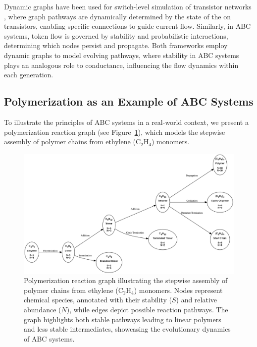 \documentclass[entropy,article,submit,pdftex,oneauthor]{Definitions/mdpi}
\begin{document}
Dynamic graphs have been used for switch-level simulation of transistor networks \cite{AdlerCAD}, where graph pathways are dynamically determined by the state of the on transistors, enabling specific connections to guide current flow. Similarly, in ABC systems, token flow is governed by stability and probabilistic interactions, determining which nodes persist and propagate. Both frameworks employ dynamic graphs to model evolving pathways, where stability in ABC systems plays an analogous role to conductance, influencing the flow dynamics within each generation.

\subsection{Polymerization as an Example of ABC Systems}

To illustrate the principles of ABC systems in a real-world context, we present a polymerization reaction graph (see Figure~\ref{fig:polymerization_graph}), which models the stepwise assembly of polymer chains from ethylene (\( \text{C}_2\text{H}_4 \)) monomers. 

\begin{figure}[h!]
    \centering
    \includegraphics[width=\textwidth]{abc_poly.png}
    \caption{Polymerization reaction graph illustrating the stepwise assembly of polymer chains from ethylene (\( \text{C}_2\text{H}_4 \)) monomers. Nodes represent chemical species, annotated with their stability (\( S \)) and relative abundance (\( N \)), while edges depict possible reaction pathways. The graph highlights both stable pathways leading to linear polymers and less stable intermediates, showcasing the evolutionary dynamics of ABC systems.}
    \label{fig:polymerization_graph}
\end{figure}
\end{document}

